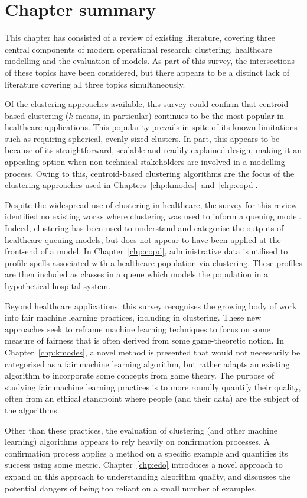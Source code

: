 \section{Chapter summary}

This chapter has consisted of a review of existing literature, covering three
central components of modern operational research: clustering, healthcare
modelling and the evaluation of models. As part of this survey, the
intersections of these topics have been considered, but there appears to be a
distinct lack of literature covering all three topics simultaneously.

Of the clustering approaches available, this survey could confirm that
centroid-based clustering (\(k\)-means, in particular) continues to be the most
popular in healthcare applications. This popularity prevails in spite of its
known limitations such as requiring spherical, evenly sized clusters. In part,
this appears to be because of its straightforward, scalable and readily
explained design, making it an appealing option when non-technical stakeholders
are involved in a modelling process. Owing to this, centroid-based clustering
algorithms are the focus of the clustering approaches used in
Chapters~\ref{chp:kmodes}~and~\ref{chp:copd}.

Despite the widespread use of clustering in healthcare, the survey for this
review identified no existing works where clustering was used to inform a
queuing model. Indeed, clustering has been used to understand and categorise the
outputs of healthcare queuing models, but does not appear to have been applied
at the front-end of a model. In Chapter~\ref{chp:copd}, administrative data is
utilised to profile spells associated with a healthcare population via
clustering. These profiles are then included as classes in a queue which models
the population in a hypothetical hospital system.

Beyond healthcare applications, this survey recognises the growing body of work
into fair machine learning practices, including in clustering. These new
approaches seek to reframe machine learning techniques to focus on some measure
of fairness that is often derived from some game-theoretic notion. In
Chapter~\ref{chp:kmodes}, a novel method is presented that would not necessarily
be categorised as a fair machine learning algorithm, but rather adapts an
existing algorithm to incorporate some concepts from game theory. The purpose of
studying fair machine learning practices is to more roundly quantify their
quality, often from an ethical standpoint where people (and their data) are the
subject of the algorithms.

Other than these practices, the evaluation of clustering (and other machine
learning) algorithms appears to rely heavily on confirmation processes. A
confirmation process applies a method on a specific example and quantifies its
success using some metric. Chapter~\ref{chp:edo} introduces a novel approach to
expand on this approach to understanding algorithm quality, and discusses the
potential dangers of being too reliant on a small number of examples.
